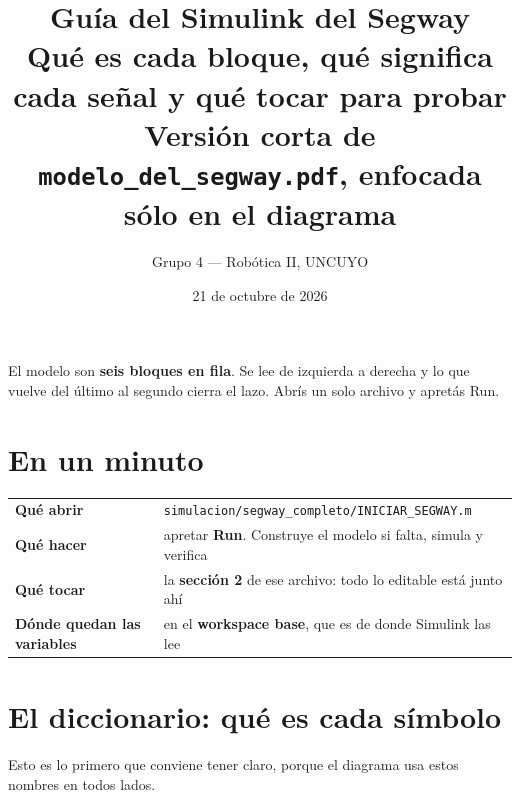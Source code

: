 \documentclass[11pt,a4paper]{article}
\title{\vspace{-1.8cm}\huge Guía del Simulink del Segway\\[8pt]
\large Qué es cada bloque, qué significa cada señal y qué tocar para probar\\[12pt]
\normalsize Versión corta de \texttt{modelo\_del\_segway.pdf}, enfocada sólo en el diagrama}
\author{Grupo 4 --- Robótica II, UNCUYO}
\date{21 de octubre de 2026}
\begin{document}
\maketitle
\thispagestyle{empty}

\begin{idea}
El modelo son \textbf{seis bloques en fila}. Se lee de izquierda a derecha y lo que vuelve
del último al segundo cierra el lazo. Abrís un solo archivo y apretás Run.
\end{idea}

\vspace{-4pt}
\section*{En un minuto}

\begin{center}
\begin{tabular}{@{}ll@{}}
\toprule
\textbf{Qué abrir} & \texttt{simulacion/segway\_completo/INICIAR\_SEGWAY.m} \\
\textbf{Qué hacer} & apretar \textbf{Run}. Construye el modelo si falta, simula y verifica \\
\textbf{Qué tocar} & la \textbf{sección 2} de ese archivo: todo lo editable está junto ahí \\
\textbf{Dónde quedan las variables} & en el \textbf{workspace base}, que es de donde Simulink las lee \\
\bottomrule
\end{tabular}
\end{center}

\vspace{-6pt}
\section*{El diccionario: qué es cada símbolo}

Esto es lo primero que conviene tener claro, porque el diagrama usa estos nombres en todos lados.
\end{document}
